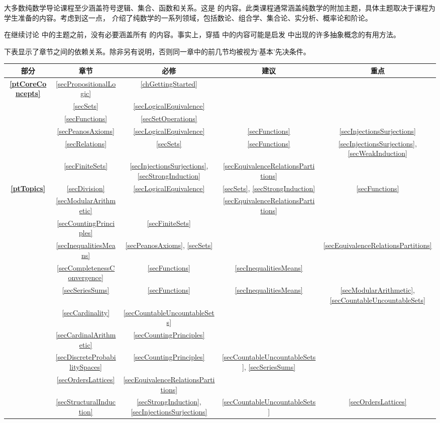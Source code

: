 大多数纯数学导论课程至少涵盖符号逻辑、集合、函数和关系。这是  的内容。此类课程通常涵盖纯数学的附加主题，具体主题取决于课程为学生准备的内容。考虑到这一点， 介绍了纯数学的一系列领域，包括数论、组合学、集合论、实分析、概率论和阶论。

在继续讨论  中的主题之前，没有必要涵盖所有  的内容。事实上，穿插  中的内容可能是启发  中出现的许多抽象概念的有用方法。

下表显示了章节之间的依赖关系。除非另有说明，否则同一章中的前几节均被视为`基本'先决条件。

\begin{center}
\begin{tabular}{c|c|ccc}
\textbf{部分} & \textbf{章节} & \textbf{必修} & \textbf{建议} & \textbf{重点} \\ \hline
\textbf{\ref{ptCoreConcepts}} & \ref{secPropositionalLogic} & \ref{chGettingStarted} &  &  \\
&\ref{secSets} & \ref{secLogicalEquivalence} &  &  \\
&\ref{secFunctions} & \ref{secSetOperations} &  &  \\
&\ref{secPeanosAxioms} & \ref{secLogicalEquivalence} & \ref{secFunctions} & \ref{secInjectionsSurjections} \\
&\ref{secRelations} & \ref{secSets} & \ref{secFunctions} & \ref{secInjectionsSurjections}, \ref{secWeakInduction} \\
&\ref{secFiniteSets} & \ref{secInjectionsSurjections}, \ref{secStrongInduction} & \ref{secEquivalenceRelationsPartitions} &  \\ \hline
\textbf{\ref{ptTopics}} & \ref{secDivision} & \ref{secLogicalEquivalence} & \ref{secSets}, \ref{secStrongInduction} & \ref{secFunctions} \\
&\ref{secModularArithmetic} &  & \ref{secEquivalenceRelationsPartitions} &  \\
&\ref{secCountingPrinciples} & \ref{secFiniteSets} &  \\
&\ref{secInequalitiesMeans} & \ref{secPeanosAxioms}, \ref{secSets} &  & \ref{secEquivalenceRelationsPartitions} \\
&\ref{secCompletenessConvergence} & \ref{secFunctions} & \ref{secInequalitiesMeans} &  \\
&\ref{secSeriesSums} & \ref{secFunctions} & \ref{secInequalitiesMeans} & \ref{secModularArithmetic}, \ref{secCountableUncountableSets} \\
&\ref{secCardinality} & \ref{secCountableUncountableSets} &  &  \\
&\ref{secCardinalArithmetic} & \ref{secCountingPrinciples} &  &  \\
&\ref{secDiscreteProbabilitySpaces} & \ref{secCountingPrinciples} & \ref{secCountableUncountableSets}, \ref{secSeriesSums} &  \\
&\ref{secOrdersLattices} & \ref{secEquivalenceRelationsPartitions} &  &  \\
&\ref{secStructuralInduction} & \ref{secStrongInduction}, \ref{secInjectionsSurjections} & \ref{secCountableUncountableSets} & \ref{secOrdersLattices}
\end{tabular}
\end{center}

